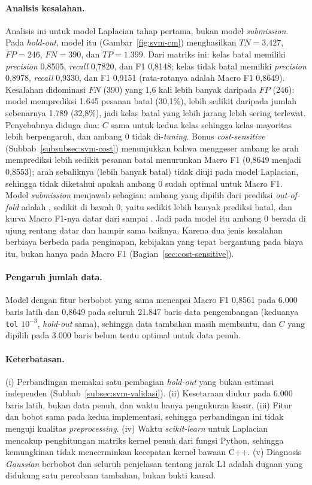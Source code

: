 \paragraph{Analisis kesalahan.} Analisis ini untuk model Laplacian tahap pertama, bukan model \textit{submission}. Pada \textit{hold-out}, model itu (Gambar~\ref{fig:svm-cm}) menghasilkan $TN = 3.427$, $FP = 246$, $FN = 390$, dan $TP = 1.399$. Dari matriks ini: kelas batal memiliki \textit{precision} 0,8505, \textit{recall} 0,7820, dan F1 0,8148; kelas tidak batal memiliki \textit{precision} 0,8978, \textit{recall} 0,9330, dan F1 0,9151 (rata-ratanya adalah Macro F1 0,8649). Kesalahan didominasi $FN$ (390) yang 1,6 kali lebih banyak daripada $FP$ (246): model memprediksi 1.645 pesanan batal (30,1\%), lebih sedikit daripada jumlah sebenarnya 1.789 (32,8\%), jadi kelas batal yang lebih jarang lebih sering terlewat. Penyebabnya diduga dua: $C$ sama untuk kedua kelas sehingga kelas mayoritas lebih berpengaruh, dan ambang 0 tidak di-\textit{tuning}. Bonus \textit{cost-sensitive} (Subbab~\ref{subsubsec:svm-cost}) menunjukkan bahwa menggeser ambang ke arah memprediksi lebih sedikit pesanan batal menurunkan Macro F1 (0,8649 menjadi 0,8553); arah sebaliknya (lebih banyak batal) tidak diuji pada model Laplacian, sehingga tidak diketahui apakah ambang 0 sudah optimal untuk Macro F1. Model \textit{submission} menjawab sebagian: ambang yang dipilih dari prediksi \textit{out-of-fold} adalah \SVMBaruAmbang{}, sedikit di bawah 0, yaitu sedikit lebih banyak prediksi batal, dan kurva Macro F1-nya datar dari \SVMBaruDatarBawah{} sampai \SVMBaruDatarAtas{}. Jadi pada model itu ambang 0 berada di ujung rentang datar dan hampir sama baiknya. Karena dua jenis kesalahan berbiaya berbeda pada penginapan, kebijakan yang tepat bergantung pada biaya itu, bukan hanya pada Macro F1 (Bagian~\ref{sec:cost-sensitive}).

\paragraph{Pengaruh jumlah data.} Model dengan fitur berbobot yang sama mencapai Macro F1 0,8561 pada 6.000 baris latih dan 0,8649 pada seluruh 21.847 baris data pengembangan (keduanya \texttt{tol} $10^{-3}$, \textit{hold-out} sama), sehingga data tambahan masih membantu, dan $C$ yang dipilih pada 3.000 baris belum tentu optimal untuk data penuh.

\paragraph{Keterbatasan.} (i) Perbandingan memakai satu pembagian \textit{hold-out} yang bukan estimasi independen (Subbab~\ref{subsec:svm-validasi}). (ii) Kesetaraan diukur pada 6.000 baris latih, bukan data penuh, dan waktu hanya pengukuran kasar. (iii) Fitur dan bobot sama pada kedua implementasi, sehingga perbandingan ini tidak menguji kualitas \textit{preprocessing}. (iv) Waktu \textit{scikit-learn} untuk Laplacian mencakup penghitungan matriks kernel penuh dari fungsi Python, sehingga kemungkinan tidak mencerminkan kecepatan kernel bawaan C++. (v) Diagnosis \textit{Gaussian} berbobot dan seluruh penjelasan tentang jarak L1 adalah dugaan yang didukung satu percobaan tambahan, bukan bukti kausal.


